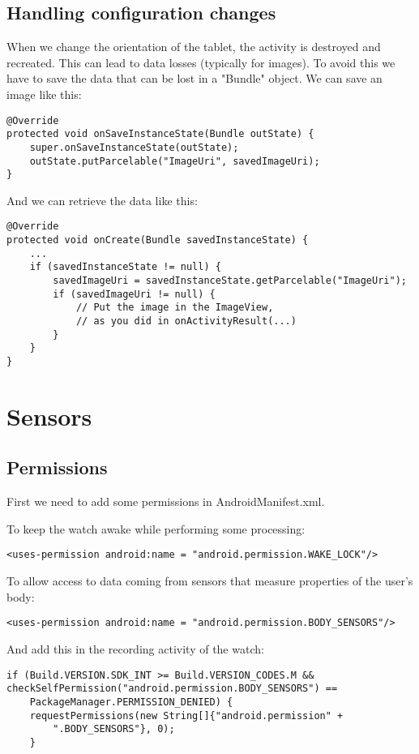 \documentclass[11pt]{article}
\begin{document}
\subsection{Handling configuration changes}
When we change the orientation of the tablet, the activity is destroyed and recreated. This can lead to data losses (typically for images). To avoid this we have to save the data that can be lost in a "Bundle" object. We can save an image like this:
\begin{lstlisting}
@Override
protected void onSaveInstanceState(Bundle outState) {
    super.onSaveInstanceState(outState);
    outState.putParcelable("ImageUri", savedImageUri);
}
\end{lstlisting}
And we can retrieve the data like this:
\begin{lstlisting}
@Override
protected void onCreate(Bundle savedInstanceState) {
    ...
    if (savedInstanceState != null) {
        savedImageUri = savedInstanceState.getParcelable("ImageUri");
        if (savedImageUri != null) {
            // Put the image in the ImageView,
            // as you did in onActivityResult(...)
        }
    }
}
\end{lstlisting}

\section{Sensors}
\subsection{Permissions}
First we need to add some permissions in AndroidManifest.xml.

To keep the watch awake while performing some processing:
\begin{lstlisting}
<uses-permission android:name = "android.permission.WAKE_LOCK"/>
\end{lstlisting}

To allow access to data coming from sensors that measure properties of the user's body:
\begin{lstlisting}
<uses-permission android:name = "android.permission.BODY_SENSORS"/>
\end{lstlisting}
And add this in the recording activity of the watch:
\begin{lstlisting}
if (Build.VERSION.SDK_INT >= Build.VERSION_CODES.M &&
checkSelfPermission("android.permission.BODY_SENSORS") ==
    PackageManager.PERMISSION_DENIED) {
    requestPermissions(new String[]{"android.permission" +
        ".BODY_SENSORS"}, 0);
    }
\end{lstlisting}
\end{document}
